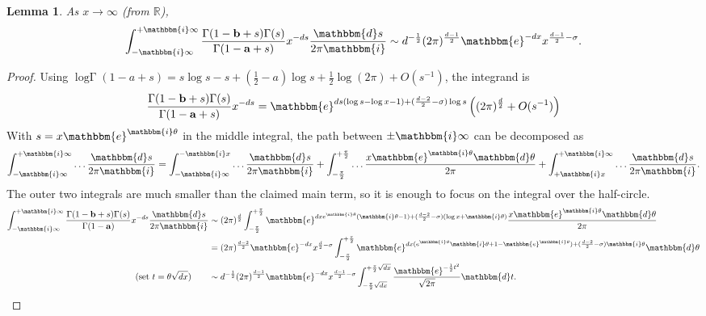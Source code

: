 \documentclass[12pt]{article}
\newcommand{\logG} {\operatorname {log \Gamma}}
\newcommand{\ee}[0] {\mathbbm{e}}
\newcommand{\ii}[0] {\mathbbm{i}}
\newcommand{\dd}[0] {\mathbbm{d}}
\numberwithin{equation}{section}
\newtheorem{lemma}[theorem]{Lemma}
\newcommand{\bfa}[0] {\mathbf{a}}
\newcommand{\bfb}[0] {\mathbf{b}}
\begin{document}
\begin{lemma}
\label{lamma_minimal_asmp}
As $x \to \infty$ (from $\mathbb{R}$),
\begin{equation*}
\int_{-\ii \infty}^{+\ii \infty} \frac{\Gamma(1-\bfb + s) \Gamma(s)}{\Gamma(1-\bfa+s)} x^{-d s} \frac{\dd s}{2\pi \ii} \sim d^{-\frac{1}{2}}(2\pi)^{\frac{d-1}{2}} \ee^{-d x} x^{\frac{d-1}{2} - \sigma}\text{.}
\end{equation*}
\end{lemma}
\begin{proof}
Using $\logG (1-a+s) = s \log s - s + (\tfrac{1}{2}-a) \log s + \frac{1}{2} \log(2\pi) + O(s^{-1})$, the integrand is
\begin{equation*}
\frac{\Gamma(1-\bfb + s) \Gamma(s)}{\Gamma(1-\bfa+s)} x^{-d s} = \ee^{d s (\log s - \log x-1) + (\frac{d-2}{2}-\sigma) \log s} \left( (2\pi)^{\frac{d}{2}} + O(s^{-1}) \right)
\end{equation*}
With $s = x \ee^{\ii \theta}$ in the middle integral, the path between $\pm \ii \infty$ can be decomposed as
\begin{equation*}
\int_{-\ii \infty}^{+\ii \infty} \dots \frac{\dd s}{2\pi \ii} = \int_{-\ii \infty}^{- \ii x} \dots \frac{\dd s}{2\pi \ii} + \int_{-\frac{\pi}{2}}^{+\frac{\pi}{2}} \dots \frac{x \ee^{\ii \theta} \dd \theta}{2\pi} + \int_{+\ii x}^{+\ii \infty} \dots \frac{\dd s}{2\pi \ii}\text{.}
\end{equation*}
The outer two integrals are much smaller than the claimed main term, so it is enough to focus on the integral over the half-circle.
\begin{align*}
\int_{-\ii \infty}^{+\ii \infty} \frac{\Gamma(1-\bfb + s) \Gamma(s)}{\Gamma(1-\bfa)} x^{-d s} \frac{\dd s}{2\pi \ii} & \sim (2\pi)^{\frac{d}{2}} \int_{-\frac{\pi}{2}}^{+\frac{\pi}{2}} \ee^{d x e^{\ii \theta} (\ii \theta-1) + (\frac{d-2}{2}-\sigma)(\log x + \ii \theta)} \frac{x \ee^{\ii \theta} \dd \theta}{2\pi}\\
& = (2\pi)^{\frac{d-2}{2}} \ee^{-d x} x^{\frac{d}{2} -\sigma} \int_{-\frac{\pi}{2}}^{+\frac{\pi}{2}} \ee^{d x (e^{\ii \theta} \ii \theta + 1-\ee^{\ii \theta}) + (\frac{d-2}{2}-\sigma) \ii \theta} \dd \theta\\
(\text{set } t = \theta \sqrt{dx} ) \quad \quad & \sim d^{-\frac{1}{2}} (2\pi)^{\frac{d-1}{2}} \ee^{-d x} x^{\frac{d-1}{2} -\sigma} \int_{-\frac{\pi}{2}\sqrt{dx}}^{+\frac{\pi}{2}\sqrt{dx}} \frac{\ee^{-\frac12 t^2}}{\sqrt{2\pi}} \dd t\text{.}
\end{align*}
\end{proof}
\end{document}
